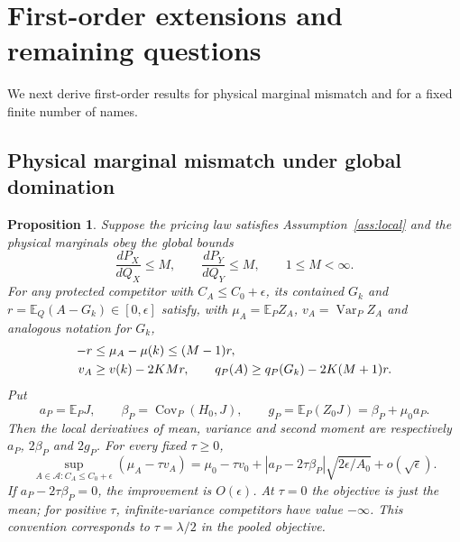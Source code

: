 \documentclass[11pt,a4paper]{amsart}
\theoremstyle{plain}
\newtheorem{proposition}[theorem]{Proposition}
\theoremstyle{definition}
\theoremstyle{remark}
\DeclareMathOperator{\Var}{Var}
\DeclareMathOperator{\Cov}{Cov}
\newcommand{\EE}{\mathbb{E}}
\newcommand{\calA}{\mathcal{A}}
\begin{document}
\section{First-order extensions and remaining questions}\label{sec:extensions}

We next derive first-order results for physical marginal mismatch and for a fixed finite number of names.

\subsection{Physical marginal mismatch under global domination}

\begin{proposition}\label{prop:mismatch}
Suppose the pricing law satisfies Assumption~\ref{ass:local} and the physical marginals obey the global bounds
\begin{equation}\label{eq:globaldomination}
 \frac{dP_X}{dQ_X}\le M,\qquad\frac{dP_Y}{dQ_Y}\le M,
 \qquad 1\le M<\infty.
\end{equation}
For any protected competitor with $C_A\le C_0+\epsilon$, its contained $G_k$ and $r=\EE_Q(A-G_k)\in[0,\epsilon]$ satisfy, with $\mu_A=\EE_PZ_A$, $v_A=\Var_PZ_A$ and analogous notation for $G_k$,
\begin{align}\label{eq:mismatchresidual}
 -r&\le\mu_A-\mu(k)\le(M-1)r,\notag\\
 v_A&\ge v(k)-2KM r,\qquad q_P(A)\ge q_P(G_k)-2K(M+1)r.
\end{align}
Put
\[
 a_P=\EE_PJ,\qquad\beta_P=\Cov_P(H_0,J),\qquad
 g_P=\EE_P(Z_0J)=\beta_P+\mu_0a_P.
\]
Then the local derivatives of mean, variance and second moment are respectively $a_P$, $2\beta_P$ and $2g_P$. For every fixed $\tau\ge0$,
\begin{equation}\label{eq:mismatchobjective}
 \sup_{A\in\calA:C_A\le C_0+\epsilon}(\mu_A-\tau v_A)
 =\mu_0-\tau v_0+|a_P-2\tau\beta_P|\sqrt{2\epsilon/A_0}
 +o(\sqrt\epsilon).
\end{equation}
If $a_P-2\tau\beta_P=0$, the improvement is $O(\epsilon)$. At $\tau=0$ the objective is just the mean; for positive $\tau$, infinite-variance competitors have value $-\infty$. This convention corresponds to $\tau=\lambda/2$ in the pooled objective.
\end{proposition}
\end{document}
